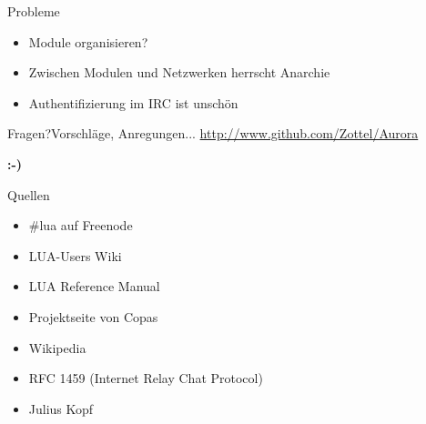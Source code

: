 \documentclass{beamer}
\begin{document}
		\begin{frame}{Probleme}
			\begin{itemize}
				\item Module organisieren?
				\item Zwischen Modulen und Netzwerken herrscht Anarchie
				\item Authentifizierung im IRC ist unschön
			\end{itemize}
		\end{frame}

		\begin{frame}{Fragen?}{Vorschläge, Anregungen...}
			\url{http://www.github.com/Zottel/Aurora}

			\textbf{:-)}
		\end{frame}

		\begin{frame}{Quellen}
			\begin{itemize}
				\item \#lua auf Freenode
				\item LUA-Users Wiki
				\item LUA Reference Manual
				\item Projektseite von Copas
				\item Wikipedia
				\item RFC 1459 (Internet Relay Chat Protocol)
				\item Julius Kopf
			\end{itemize}
		\end{frame}
		
\end{document}

